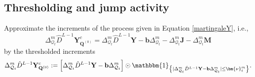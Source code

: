 \documentclass[12pt]{amsart}
\numberwithin{equation}{section}
\newcommand{\1}{\mathbf{1}}
\begin{document}
\subsection{Thresholding and jump activity} \label{Thresholding and jump activity}\cite[Section 4.3]{lucchese2026estimation}
Approximate the increments of the process given in Equation \eqref{martingaleY}, i.e.,
\begin{equation*}
    \Delta^m_{\mathcal{Q}_t}\hat{D}^{L-1}\mathbf{Y}_{\mathbf{Q}^{(0)}}^{c} = \Delta^m_{\mathcal{Q}_t}\hat{D}^{L-1}\mathbf{Y} -\mathbf{b}\Delta^m_{\mathcal{Q}_t}-\Delta^m_{\mathcal{Q}_t}\mathbf{J}-\Delta^m_{\mathcal{Q}_t}\mathbf{M}
\end{equation*}
by the thresholded increments
\begin{equation*}
\Delta^m_{\mathcal{Q}_t}\hat{D}^{L-1}\mathbf{Y}^c_{\mathbf{Q}^{(0)}} :=\left[\Delta^m_{\mathcal{Q}_t}\hat{D}^{L-1}\mathbf{Y}-\mathbf{b}\Delta^m_{\mathcal{Q}_t}\right]\odot\mathbbm{1}_{\left\lbrace \vert \Delta^m_{\mathcal{Q}_t}\hat{D}^{L-1}\mathbf{Y}-\mathbf{b}\Delta^m_{\mathcal{Q}_t}\vert\leq\bm{\nu}^m_t\right\rbrace}.
\end{equation*}
\end{document}
